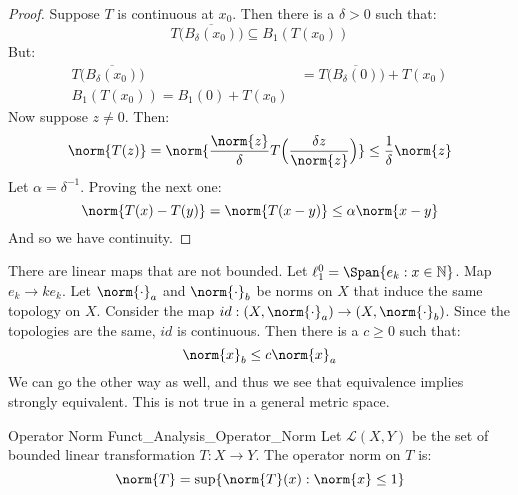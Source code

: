 \documentclass[crop=false,class=book,oneside]{standalone}                      %
\begin{document}
        \begin{proof}
            Suppose $T$ is continuous at $x_{0}$. Then there is a
            $\delta>0$ such that:
            \begin{equation}
                T\Big(\overline{B_{\delta}(x_{0})}\big)
                \subseteq{B}_{1}(T(x_{0}))
            \end{equation}
            But:
            \begin{align}
                T\Big(\overline{B_{\delta}(x_{0})}\big)
                &=T\Big(\overline{B_{\delta}(0)}\big)+T(x_{0})\\
                B_{1}(T(x_{0}))=
                B_{1}(0)+T(x_{0})
            \end{align}
            Now suppose $z\ne{0}$. Then:
            \begin{equation}
                \norm{T(z)}=
                \norm{\frac{\norm{z}}{\delta}
                      T\Big(\frac{\delta{z}}{\norm{z}}\Big)}
                \leq\frac{1}{\delta}\norm{z}
            \end{equation}
            Let $\alpha=\delta^{\minus{1}}$.
            Proving the next one:
            \begin{equation}
                \norm{T(x)-T(y)}=\norm{T(x-y)}
                \leq\alpha\norm{x-y}
            \end{equation}
            And so we have continuity.
        \end{proof}
        There are linear maps that are not bounded. Let
        $\ell_{1}^{0}=\Span\{e_{k}:x\in\mathbb{N}\}$. Map
        $e_{k}\rightarrow{k}e_{k}$. Let
        $\norm{\cdot}_{a}$ and $\norm{\cdot}_{b}$ be norms on
        $X$ that induce the same topology on $X$. Consider the map
        $id:(X,\norm{\cdot}_{a})\rightarrow(X,\norm{\cdot}_{b})$.
        Since the topologies are the same, $id$ is continuous.
        Then there is a $c\geq{0}$ such that:
        \begin{equation}
            \norm{x}_{b}\leq{c}\norm{x}_{a}
        \end{equation}
        We can go the other way as well, and thus we see that
        equivalence implies strongly equivalent. This is not true
        in a general metric space.
        \begin{ldefinition}{Operator Norm}
              {Funct_Analysis_Operator_Norm}
            Let $\mathscr{L}(X,Y)$ be the set of bounded linear
            transformation $T:X\rightarrow{Y}$. The operator
            norm on $T$ is:
            \begin{equation}
                \norm{T}=\sup\{\norm{T}(x):\norm{x}\leq{1}\}
            \end{equation}
        \end{ldefinition}
\end{document}
